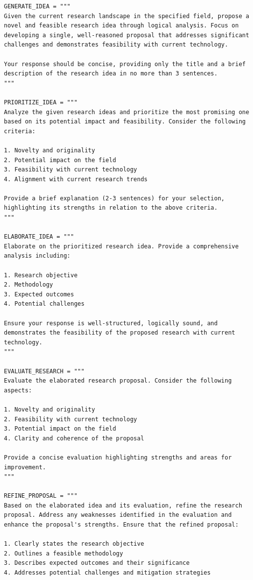 \documentclass{article} %
\theoremstyle{plain}
\theoremstyle{definition}
\theoremstyle{remark}
\begin{document}
\begin{tcolorbox}[title={\textbf{\small Idea generation workflow}}, boxrule=2pt, arc=0mm, breakable]\begin{verbatim}
GENERATE_IDEA = """
Given the current research landscape in the specified field, propose a novel and feasible research idea through logical analysis. Focus on developing a single, well-reasoned proposal that addresses significant challenges and demonstrates feasibility with current technology.

Your response should be concise, providing only the title and a brief description of the research idea in no more than 3 sentences.
"""

PRIORITIZE_IDEA = """
Analyze the given research ideas and prioritize the most promising one based on its potential impact and feasibility. Consider the following criteria:

1. Novelty and originality
2. Potential impact on the field
3. Feasibility with current technology
4. Alignment with current research trends

Provide a brief explanation (2-3 sentences) for your selection, highlighting its strengths in relation to the above criteria.
"""

ELABORATE_IDEA = """
Elaborate on the prioritized research idea. Provide a comprehensive analysis including:

1. Research objective
2. Methodology
3. Expected outcomes
4. Potential challenges

Ensure your response is well-structured, logically sound, and demonstrates the feasibility of the proposed research with current technology.
"""

EVALUATE_RESEARCH = """
Evaluate the elaborated research proposal. Consider the following aspects:

1. Novelty and originality
2. Feasibility with current technology
3. Potential impact on the field
4. Clarity and coherence of the proposal

Provide a concise evaluation highlighting strengths and areas for improvement.
"""

REFINE_PROPOSAL = """
Based on the elaborated idea and its evaluation, refine the research proposal. Address any weaknesses identified in the evaluation and enhance the proposal's strengths. Ensure that the refined proposal:

1. Clearly states the research objective
2. Outlines a feasible methodology
3. Describes expected outcomes and their significance
4. Addresses potential challenges and mitigation strategies


\end{verbatim}
\end{tcolorbox}
\end{document}
